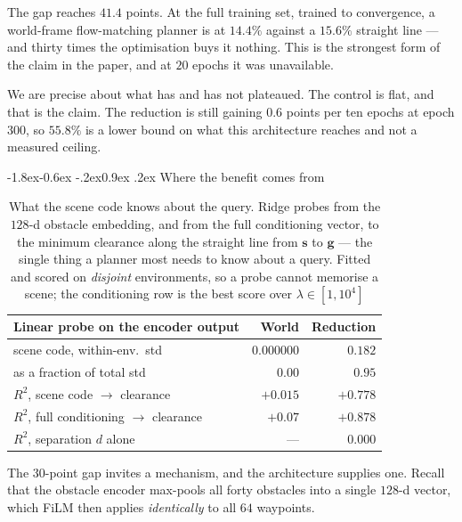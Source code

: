 \documentclass[10pt,twocolumn,letterpaper]{article}
\makeatletter
\newcommand{\toprule}{\hline}
\newcommand{\midrule}{\hline}
\newcommand{\bottomrule}{\hline}
\renewcommand\subsection{\@startsection{subsection}{2}{\z@}%
  {-1.8ex\@plus -0.6ex \@minus -.2ex}{0.9ex \@plus .2ex}%
  {\normalfont\normalsize\bfseries}}
\theoremstyle{plain}
\newcommand{\svec}{\mathbf{s}}
\newcommand{\gvec}{\mathbf{g}}
\makeatother
\begin{document}
\noindent
The gap reaches $\mathbf{41.4}$ points. At the full training set, trained to
convergence, a world-frame flow-matching planner is at $14.4\%$ against a
$15.6\%$ straight line --- and thirty times the optimisation buys it nothing.
This is the strongest form of the claim in the paper, and at $20$ epochs it was
unavailable.

We are precise about what has and has not plateaued. The control is flat, and
that is the claim. The reduction is still gaining $0.6$ points per ten epochs at
epoch $300$, so $55.8\%$ is a lower bound on what this architecture reaches and
not a measured ceiling.


\subsection{Where the benefit comes from}
\label{sec:mechanism}

\begin{table}[t]
\centering
\footnotesize
\setlength{\tabcolsep}{4pt}
\begin{tabular}{lrr}
\toprule
Linear probe on the encoder output & World & Reduction \\
\midrule
scene code, within-env.\ std           & $0.000000$ & $0.182$ \\
\quad as a fraction of total std        & $0.00$     & $0.95$ \\
$R^2$, scene code $\to$ clearance       & $+0.015$   & $\mathbf{+0.778}$ \\
$R^2$, full conditioning $\to$ clearance& $+0.07$    & $\mathbf{+0.878}$ \\
$R^2$, separation $d$ alone             & ---        & $0.000$ \\
\bottomrule
\end{tabular}
\caption{What the scene code knows about the query. Ridge probes from the
$128$-d obstacle embedding, and from the full conditioning vector, to the
minimum clearance along the straight line from $\svec$ to $\gvec$ --- the single
thing a planner most needs to know about a query. Fitted and scored on
\emph{disjoint} environments, so a probe cannot memorise a scene; the
conditioning row is the best score over $\lambda \in [1, 10^4]$}
\label{tab:probe}
\end{table}

The $30$-point gap invites a mechanism, and the architecture supplies one. Recall
that the obstacle encoder max-pools all forty obstacles into a single $128$-d
vector, which FiLM then applies \emph{identically} to all $64$ waypoints.
\end{document}
